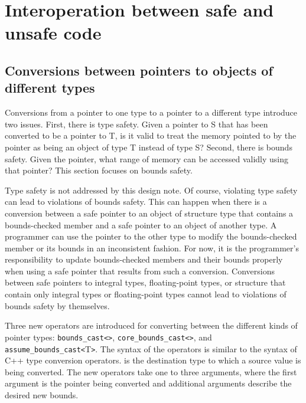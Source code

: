 
\chapter{Interoperation between safe and unsafe code}
\label{chapter:interoperation}

\section{Conversions between pointers to objects of different types}
\label{section:pointer-casting}

Conversions from a pointer to one type to a pointer to a different type
introduce two issues. First, there is type safety. Given a pointer to S
that has been converted to be a pointer to T, is it valid to treat the
memory pointed to by the pointer as being an object of type T instead of
type S? Second, there is bounds safety. Given the pointer, what range of
memory can be accessed validly using that pointer? This section focuses on
bounds safety.

Type safety is not addressed by this design note. Of course, violating
type safety can lead to violations of bounds safety. This can happen
when there is a conversion between a safe pointer to an object of
structure type that contains a bounds-checked member and a safe pointer
to an object of another type. A programmer can use the pointer to the
other type to modify the bounds-checked member or its bounds in an
inconsistent fashion. For now, it is the programmer's responsibility to
update bounds-checked members and their bounds properly when using a
safe pointer that results from such a conversion. Conversions between
safe pointers to integral types, floating-point types, or structure that
contain only integral types or floating-point types cannot lead to
violations of bounds safety by themselves.

Three new operators are introduced for converting between the different
kinds of pointer types:
\texttt{bounds\_cast\textless{}}\texttt{\textgreater{}},
\texttt{core\_bounds\_cast\textless{}}\texttt{\textgreater{}},
and \texttt{assume\_bounds\_cast\textless{}}T\texttt{\textgreater{}}.
The syntax of the operators is similar to the syntax of C++ type
conversion operators.  is the destination type to which a source
value is being converted. The new operators take one to three arguments,
where the first argument is the pointer being converted and additional
arguments describe the desired new bounds.

